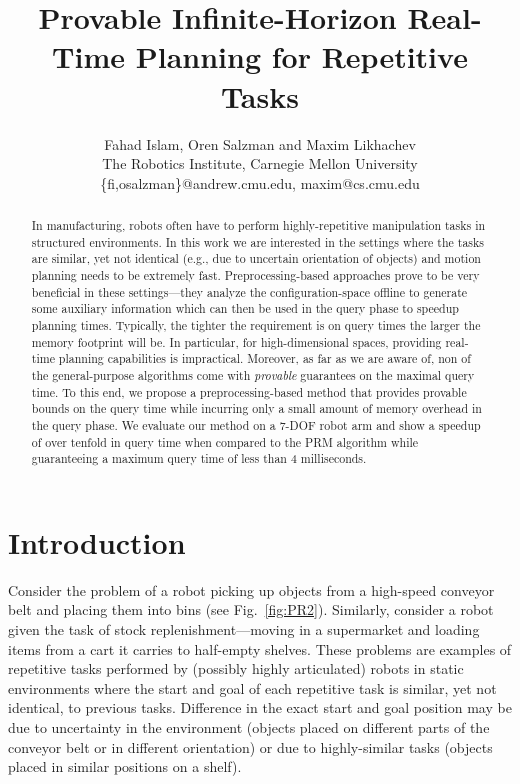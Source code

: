 \documentclass[letterpaper, 10 pt, conference]{ieeeconf}  %
\title{\LARGE \bf
Provable Infinite-Horizon Real-Time Planning for Repetitive Tasks
}
\author{
Fahad Islam,
Oren Salzman {\normalfont and}
Maxim Likhachev
\\
The Robotics Institute, Carnegie Mellon University\\
%
\{fi,osalzman\}@andrew.cmu.edu,
maxim@cs.cmu.edu
}
\begin{document}
\maketitle
\thispagestyle{empty}
\pagestyle{empty}


\begin{abstract}

In manufacturing, robots often have to perform highly-repetitive manipulation tasks in structured environments. 
In this work we are interested in the settings where the tasks are similar, yet not identical (e.g., due to uncertain orientation of objects) and motion planning needs to be extremely fast. 
Preprocessing-based approaches prove to be very beneficial in these settings---they analyze the configuration-space offline to generate some auxiliary information which can then be used in the query phase to speedup planning times. 
%
Typically, the tighter the requirement is on query times the larger the memory footprint will be. In particular, for high-dimensional spaces, providing real-time planning capabilities is impractical.
Moreover, as far as we are aware of, non of the general-purpose algorithms come with \emph{provable} guarantees on the maximal query time.
%
To this end, we propose a preprocessing-based method that provides provable bounds on the query time while incurring only a small amount of memory overhead in the query phase. We evaluate our method on a 7-DOF robot arm and show a speedup of over tenfold in query time when compared to the \textsf{PRM} algorithm while guaranteeing a maximum query time of less than 4 milliseconds.

\end{abstract}

\section{Introduction}

Consider the problem of a robot picking up objects from a high-speed conveyor belt and placing them into bins (see Fig.~\ref{fig:PR2}).
Similarly, consider a robot given the task of stock replenishment---moving in a supermarket and loading items from a cart it carries to half-empty shelves.
These problems are examples of repetitive tasks performed by (possibly highly articulated) robots in static environments where the start and goal of each repetitive task is similar, yet not identical, to previous tasks.
Difference in the exact start and goal position may be due to uncertainty in the environment (objects placed on different parts of the conveyor belt or in different orientation) or due to highly-similar tasks (objects placed in similar positions on a shelf).
\end{document}
